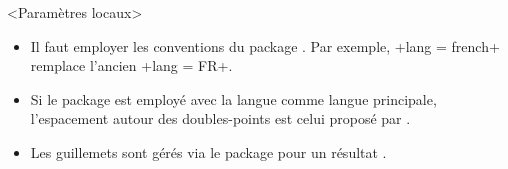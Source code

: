 

\begin{bdoctopic}<Paramètres locaux>
    \begin{itemize}
        \item Il faut employer les conventions  du package .
        Par exemple, \bdocinlatex+lang = french+ remplace l'ancien \bdocinlatex+lang = FR+.

        \item Si le package  est employé avec la langue  comme langue principale, l'espacement autour des doubles-points est celui proposé par .

        \item Les guillemets sont gérés via le package  pour un résultat .
    \end{itemize}
\end{bdoctopic}

